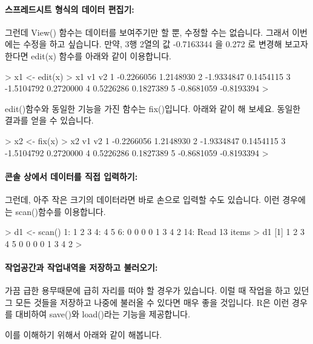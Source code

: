 \paragraph{스프레드시트 형식의 데이터 편집기:}
그런데 View() 함수는 데이터를 보여주기만 할 뿐, 수정할 수는 없습니다.
그래서 이번에는 수정을 하고 싶습니다. 
만약, 3행 2열의 값 -0.7163344 을 0.272 로 변경해 보고자 한다면 edit(x) 함수를 아래와 같이 이용합니다.
\begin{Schunk}
\begin{Soutput}
> x1 <- edit(x)
> x1
          v1         v2
1 -0.2266056  1.2148930
2 -1.9334847  0.1454115
3 -1.5104792  0.2720000
4  0.5226286  0.1827389
5 -0.8681059 -0.8193394
> 
\end{Soutput}
\end{Schunk}

edit()함수와 동일한 기능을 가진 함수는 fix()입니다. 
아래와 같이 해 보세요. 동일한 결과를 얻을 수 있습니다. 
\begin{Schunk}
\begin{Soutput}
> x2 <- fix(x)
> x2
          v1         v2
1 -0.2266056  1.2148930
2 -1.9334847  0.1454115
3 -1.5104792  0.2720000
4  0.5226286  0.1827389
5 -0.8681059 -0.8193394
> 
\end{Soutput}
\end{Schunk}

\paragraph{콘솔 상에서 데이터를 직접 입력하기:}
그런데, 아주 작은 크기의 데이터라면 바로 손으로 입력할 수도 있습니다.
이런 경우에는 scan()함수를 이용합니다. 

\begin{Schunk}
\begin{Soutput}
> d1 <- scan()
1: 1 2 3 
4: 4 5 
6: 0 0 0 0 1 3 4 2 
14: 
Read 13 items
> d1
 [1] 1 2 3 4 5 0 0 0 0 1 3 4 2
> 
\end{Soutput}
\end{Schunk}

\paragraph{작업공간과 작업내역을 저장하고 불러오기:}
가끔 급한 용무때문에 급히 자리를 떠야 할 경우가 있습니다. 
이럴 때 작업을 하고 있던 그 모든 것들을 저장하고 나중에 불러올 수 있다면 매우 좋을 것입니다.
R은 이런 경우를 대비하여 save()와 load()라는 기능을 제공합니다. 

이를 이해하기 위해서 아래와 같이 해봅니다. 

